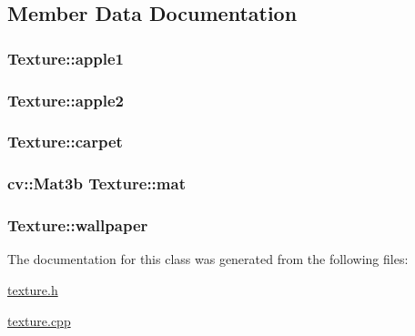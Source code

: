 \subsection{Member Data Documentation}
\subsubsection[{\texorpdfstring{apple1}{apple1}}]{ Texture\+::apple1\hspace{0.3cm}{\ttfamily [static]}}\hypertarget{classTexture_a8e1a3440b73df4de4cdc72e888ce3583}{}\label{classTexture_a8e1a3440b73df4de4cdc72e888ce3583}
\subsubsection[{\texorpdfstring{apple2}{apple2}}]{ Texture\+::apple2\hspace{0.3cm}{\ttfamily [static]}}\hypertarget{classTexture_a7671792b2d9981a786ec01069a8d5f35}{}\label{classTexture_a7671792b2d9981a786ec01069a8d5f35}
\subsubsection[{\texorpdfstring{carpet}{carpet}}]{ Texture\+::carpet\hspace{0.3cm}{\ttfamily [static]}}\hypertarget{classTexture_ade074c4142073f53a973ec8223395f67}{}\label{classTexture_ade074c4142073f53a973ec8223395f67}
\subsubsection[{\texorpdfstring{mat}{mat}}]{\setlength{\rightskip}{0pt plus 5cm}cv\+::\+Mat3b Texture\+::mat\hspace{0.3cm}{\ttfamily [private]}}\hypertarget{classTexture_a5d776b17260e556ee5bd94cbbd412413}{}\label{classTexture_a5d776b17260e556ee5bd94cbbd412413}
\subsubsection[{\texorpdfstring{wallpaper}{wallpaper}}]{ Texture\+::wallpaper\hspace{0.3cm}{\ttfamily [static]}}\hypertarget{classTexture_a1fe6c8c86fe00b7f58d874c136b632ba}{}\label{classTexture_a1fe6c8c86fe00b7f58d874c136b632ba}


The documentation for this class was generated from the following files\+:\begin{DoxyCompactItemize}
\item 
\hyperlink{texture_8h}{texture.\+h}\item 
\hyperlink{texture_8cpp}{texture.\+cpp}\end{DoxyCompactItemize}
